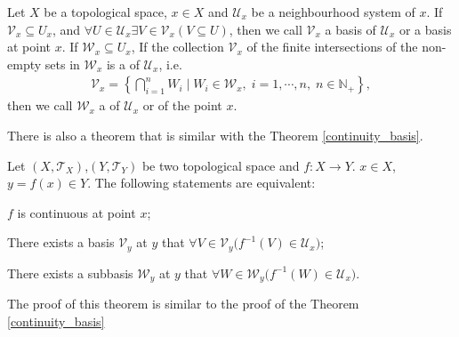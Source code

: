 \documentclass[openany]{book}
\begin{document}
\begin{definition}\label{basis_subbasis_neighbourhood}
Let $X$ be a topological space, $x\in X$ and $\mathscr U_x$ be a neighbourhood system of $x$.
If $\mathscr V_x \subseteq U_x$, and $\forall U\in \mathscr U_x \exists V\in \mathscr V_x (V\subseteq U)$, 
then we call $\mathscr V_x$ a basis of $\mathscr U_x$ or a basis at point $x$.
If $\mathscr W_x \subseteq U_x$, If the collection $\mathscr V_x$ of the finite intersections of the non-empty sets in $\mathscr W_x$ is a  of $\mathscr U_x$, i.e.\ 
\begin{align*}
	\mathscr V_x = \left\{
		\bigcap\limits_{i=1}^n W_i \mid
			W_i \in \mathscr W_x,\;i=1,\cdots,n,\;n\in\mathbb N_+\right\},
\end{align*}
then we call $\mathscr W_x$ a  of $\mathscr U_x$ or of the point $x$.
\end{definition}

There is also a theorem that is similar with the Theorem \ref{continuity_basis}.

\begin{theorem}\label{continuity_basis_neighbourhood}
Let $(X,\mathscr T_X)$,$(Y,\mathscr T_Y)$ be two topological space and $f \colon X\to Y$.
$x\in X$, $y = f(x)\in Y$.
The following statements are equivalent:
\begin{conditionlist}[label=(\arabic*)]
\item $f $ is continuous at point $x$;
\item There exists a basis $\mathscr V_y$ at $y$ that $\forall V\in \mathscr V_y\big(
	f^{-1}(V) \in \mathscr U_x\big)$;
\item There exists a subbasis $\mathscr W_y$ at $y$ that $\forall W\in \mathscr W_y\big(
	f^{-1}(W) \in \mathscr U_x\big)$.
\end{conditionlist}
\end{theorem}
The proof of this theorem is similar to the proof of the Theorem \ref{continuity_basis}
\end{document}
